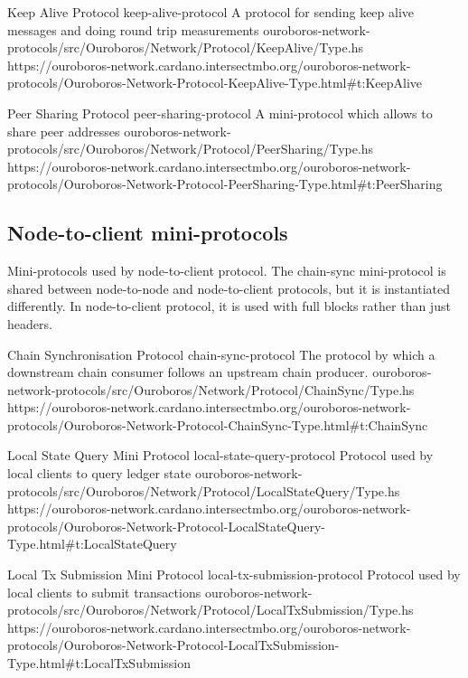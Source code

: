 \miniEntry
    {Keep Alive Protocol}
    {keep-alive-protocol}
    {A protocol for sending keep alive messages and doing round trip measurements}
    {ouroboros-network-protocols/src/Ouroboros/Network/Protocol/KeepAlive/Type.hs}
    {https://ouroboros-network.cardano.intersectmbo.org/ouroboros-network-protocols/Ouroboros-Network-Protocol-KeepAlive-Type.html\#t:KeepAlive}

\miniEntry
    {Peer Sharing Protocol}
    {peer-sharing-protocol}
    {A mini-protocol which allows to share peer addresses}
    {ouroboros-network-protocols/src/Ouroboros/Network/Protocol/PeerSharing/Type.hs}
    {https://ouroboros-network.cardano.intersectmbo.org/ouroboros-network-protocols/Ouroboros-Network-Protocol-PeerSharing-Type.html\#t:PeerSharing}

\subsection{Node-to-client mini-protocols}

Mini-protocols used by node-to-client protocol.  The chain-sync mini-protocol
is shared between node-to-node and node-to-client protocols, but it is instantiated differently.  In
node-to-client protocol, it is used with full blocks rather than just headers.

\miniEntry
    {Chain Synchronisation Protocol}
    {chain-sync-protocol}
    {The protocol by which a downstream chain consumer follows an upstream chain producer.}
    {ouroboros-network-protocols/src/Ouroboros/Network/Protocol/ChainSync/Type.hs}
    {https://ouroboros-network.cardano.intersectmbo.org/ouroboros-network-protocols/Ouroboros-Network-Protocol-ChainSync-Type.html\#t:ChainSync}

\miniEntry
    {Local State Query Mini Protocol}
    {local-state-query-protocol}
    {Protocol used by local clients to query ledger state}
    {ouroboros-network-protocols/src/Ouroboros/Network/Protocol/LocalStateQuery/Type.hs}
    {https://ouroboros-network.cardano.intersectmbo.org/ouroboros-network-protocols/Ouroboros-Network-Protocol-LocalStateQuery-Type.html\#t:LocalStateQuery}

\miniEntry
    {Local Tx Submission Mini Protocol}
    {local-tx-submission-protocol}
    {Protocol used by local clients to submit transactions}
    {ouroboros-network-protocols/src/Ouroboros/Network/Protocol/LocalTxSubmission/Type.hs}
    {https://ouroboros-network.cardano.intersectmbo.org/ouroboros-network-protocols/Ouroboros-Network-Protocol-LocalTxSubmission-Type.html\#t:LocalTxSubmission}

